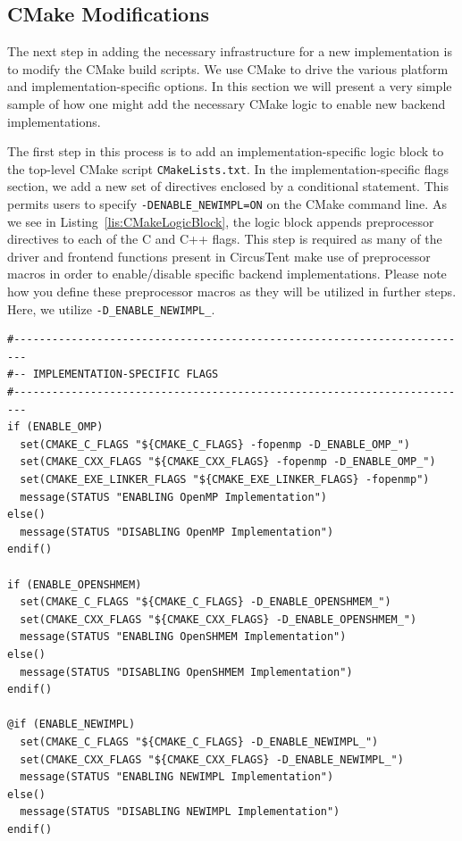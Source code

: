 \documentclass{article}
\begin{document}
\vspace{0.125in}

\clearpage
\subsection{CMake Modifications}
\label{sec:CMakeMods}

The next step in adding the necessary infrastructure for a new implementation 
is to modify the CMake build scripts.  We use CMake to drive the various platform 
and implementation-specific options.  In this section we will present a very simple 
sample of how one might add the necessary CMake logic to enable new backend implementations.  

The first step in this process is to add an implementation-specific logic block to the 
top-level CMake script \texttt{CMakeLists.txt}.  In the implementation-specific flags section, 
we add a new set of directives enclosed by a conditional statement.  This permits users
to specify \texttt{-DENABLE\_NEWIMPL=ON} on the CMake command line.  As we see 
in Listing~\ref{lis:CMakeLogicBlock}, the logic block appends preprocessor directives 
to each of the C and C++ flags.  This step is required as many of the driver and frontend 
functions present in CircusTent make use of preprocessor macros in order to enable/disable 
specific backend implementations.  Please note how you define these preprocessor macros 
as they will be utilized in further steps.  Here, we utilize \texttt{-D\_ENABLE\_NEWIMPL\_}.  

\vspace{0.125in}
\begin{lstlisting}[frame=single,style=base,caption={CMake Logic Block},captionpos=b,label={lis:CMakeLogicBlock}]
#------------------------------------------------------------------------
#-- IMPLEMENTATION-SPECIFIC FLAGS
#------------------------------------------------------------------------
if (ENABLE_OMP)
  set(CMAKE_C_FLAGS "${CMAKE_C_FLAGS} -fopenmp -D_ENABLE_OMP_")
  set(CMAKE_CXX_FLAGS "${CMAKE_CXX_FLAGS} -fopenmp -D_ENABLE_OMP_")
  set(CMAKE_EXE_LINKER_FLAGS "${CMAKE_EXE_LINKER_FLAGS} -fopenmp")
  message(STATUS "ENABLING OpenMP Implementation")
else()
  message(STATUS "DISABLING OpenMP Implementation")
endif()

if (ENABLE_OPENSHMEM)
  set(CMAKE_C_FLAGS "${CMAKE_C_FLAGS} -D_ENABLE_OPENSHMEM_")
  set(CMAKE_CXX_FLAGS "${CMAKE_CXX_FLAGS} -D_ENABLE_OPENSHMEM_")
  message(STATUS "ENABLING OpenSHMEM Implementation")
else()
  message(STATUS "DISABLING OpenSHMEM Implementation")
endif()

@if (ENABLE_NEWIMPL)
  set(CMAKE_C_FLAGS "${CMAKE_C_FLAGS} -D_ENABLE_NEWIMPL_")
  set(CMAKE_CXX_FLAGS "${CMAKE_CXX_FLAGS} -D_ENABLE_NEWIMPL_")
  message(STATUS "ENABLING NEWIMPL Implementation")
else()
  message(STATUS "DISABLING NEWIMPL Implementation")
endif()
\end{lstlisting}
\end{document}
